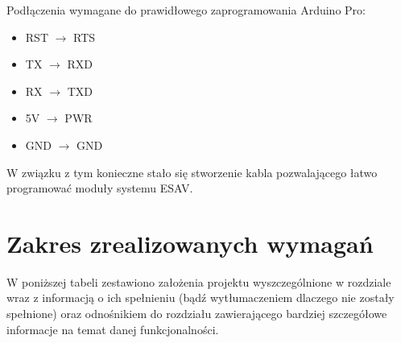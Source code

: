 Podłączenia wymagane do prawidłowego zaprogramowania Arduino Pro:

\begin{itemize}
\item RST $\rightarrow$ RTS
\item TX $\rightarrow$ RXD
\item RX $\rightarrow$ TXD
\item 5V $\rightarrow$ PWR
\item GND $\rightarrow$ GND
\end{itemize}

W związku z tym konieczne stało się stworzenie kabla pozwalającego łatwo programować moduły systemu ESAV.



\section{Zakres zrealizowanych wymagań}
\label{sec:zrealizowane_wymagania}

W poniższej tabeli zestawiono założenia projektu wyszczególnione w rozdziale wraz z informacją o ich spełnieniu (bądź wytłumaczeniem dlaczego nie zostały spełnione) oraz odnośnikiem do rozdziału zawierającego bardziej szczegółowe informacje na temat danej funkcjonalności.

